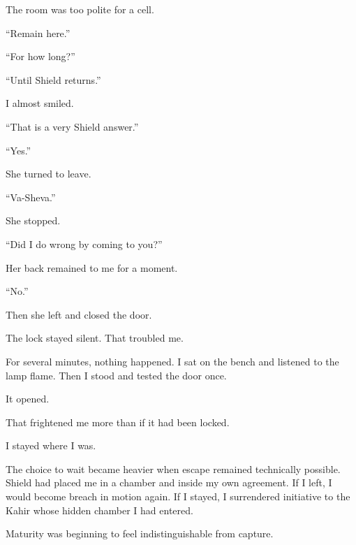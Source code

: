 The room was too polite for a cell.\par

``Remain here.''\par

``For how long?''\par

``Until Shield returns.''\par

I almost smiled.\par

``That is a very Shield answer.''\par

``Yes.''\par

She turned to leave.\par

``Va-Sheva.''\par

She stopped.\par

``Did I do wrong by coming to you?''\par

Her back remained to me for a moment.\par

``No.''\par

Then she left and closed the door.\par

The lock stayed silent. That troubled me.\par

For several minutes, nothing happened. I sat on the bench and listened to the lamp flame. Then I stood and tested the door once.\par

It opened.\par

That frightened me more than if it had been locked.\par

I stayed where I was.\par

The choice to wait became heavier when escape remained technically possible. Shield had placed me in a chamber and inside my own agreement. If I left, I would become breach in motion again. If I stayed, I surrendered initiative to the Kahir whose hidden chamber I had entered.\par

Maturity was beginning to feel indistinguishable from capture.\par

